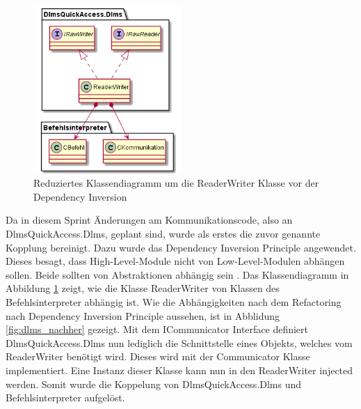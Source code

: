 \begin{figure}[H]
   \centering
   \includegraphics[width=0.5\textwidth]{gfx/dlms_vorher.png}
   \caption{
      Reduziertes Klassendiagramm um die ReaderWriter Klasse vor der Dependency Inversion
   }
   \label{fig:dlms_vorher}
\end{figure}

Da in diesem Sprint Änderungen am Kommunikationscode, also an DlmsQuickAccess.Dlms, geplant sind, wurde als erstes die zuvor genannte Kopplung bereinigt.
Dazu wurde das Dependency Inversion Principle angewendet.
Dieses besagt, dass High-Level-Module nicht von Low-Level-Modulen abhängen sollen.
Beide sollten von Abstraktionen abhängig sein \parencite{madasu35solid}.
Das Klassendiagramm in Abbildung \ref{fig:dlms_vorher} zeigt, wie die Klasse ReaderWriter von Klassen des Befehlsinterpreter abhängig ist.
Wie die Abhängigkeiten nach dem Refactoring nach Dependency Inversion Principle aussehen, ist in Abblidung \ref{fig:dlms_nachher} gezeigt.
Mit dem ICommunicator Interface definiert DlmsQuickAccess.Dlms nun lediglich die Schnittstelle eines Objekts, welches vom ReaderWriter benötigt wird.
Dieses wird mit der Communicator Klasse implementiert. Eine Instanz dieser Klasse kann nun in den ReaderWriter injected werden.
Somit wurde die Koppelung von DlmsQuickAccess.Dlms und Befehlsinterpreter aufgelöst.




